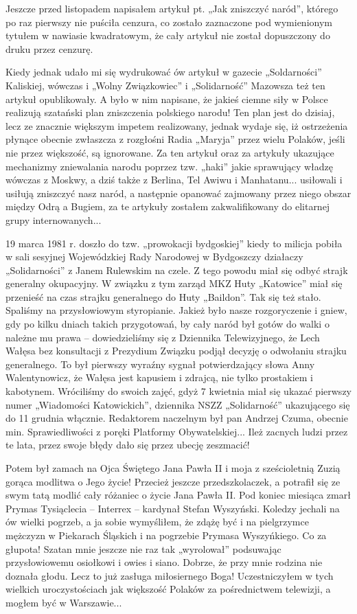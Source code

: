 Jeszcze przed listopadem napisałem artykuł pt. „Jak zniszczyć naród”, którego po raz pierwszy nie puściła cenzura, co zostało zaznaczone pod wymienionym tytułem w nawiasie kwadratowym, że cały artykuł nie został dopuszczony do druku przez cenzurę.

Kiedy jednak udało mi się wydrukować ów artykuł w gazecie „Soldarności” Kaliskiej, wówczas i „Wolny Związkowiec” i „Solidarność” Mazowsza też ten artykuł opublikowały. A było w nim napisane, że jakieś ciemne siły w Polsce realizują szatański plan zniszczenia polskiego narodu! Ten plan jest do dzisiaj, lecz ze znacznie większym impetem realizowany, jednak wydaje się, iż ostrzeżenia płynące obecnie zwłaszcza z rozgłośni Radia „Maryja” przez wielu Polaków, jeśli nie przez większość, są ignorowane. Za ten artykuł oraz za artykuły ukazujące mechanizmy zniewalania narodu poprzez tzw. „haki” jakie sprawujący władzę wówczas z Moskwy, a dziś także z Berlina, Tel Awiwu i Manhatanu... usiłowali i usiłują zniszczyć nasz naród, a następnie opanować zajmowany przez niego obszar między Odrą a Bugiem, za te artykuły zostałem zakwalifikowany do elitarnej grupy internowanych...

19 marca 1981 r. doszło do tzw. „prowokacji bydgoskiej” kiedy to milicja pobiła w sali sesyjnej Wojewódzkiej Rady Narodowej w Bydgoszczy działaczy „Solidarności” z Janem Rulewskim na czele. Z tego powodu miał się odbyć strajk generalny okupacyjny. W związku z tym zarząd MKZ Huty „Katowice” miał się przenieść na czas strajku generalnego do Huty „Baildon”. Tak się też stało. Spaliśmy na przysłowiowym styropianie. Jakież było nasze rozgoryczenie i gniew, gdy po kilku dniach takich przygotowań, by cały naród był gotów do walki o należne mu prawa – dowiedzieliśmy się z Dziennika Telewizyjnego, że Lech Wałęsa bez konsultacji z Prezydium Związku podjął decyzję o odwołaniu strajku generalnego. To był pierwszy wyraźny sygnał potwierdzający słowa Anny Walentynowicz, że Wałęsa jest kapusiem i zdrajcą, nie tylko prostakiem i kabotynem. Wróciliśmy do swoich zajęć, gdyż 7 kwietnia miał się ukazać pierwszy numer „Wiadomości Katowickich”, dziennika NSZZ „Solidarność” ukazującego się do 11 grudnia włącznie. Redaktorem naczelnym był pan Andrzej Czuma, obecnie min. Sprawiedliwości z poręki Platformy Obywatelskiej... Ileż zacnych ludzi przez te lata, przez swoje błędy dało się przez ubecję zeszmacić!

Potem był zamach na Ojca Świętego Jana Pawła II i moja z sześcioletnią Zuzią gorąca modlitwa o Jego życie! Przecież jeszcze przedszkolaczek, a potrafił się ze swym tatą modlić cały różaniec o życie Jana Pawła II. Pod koniec miesiąca zmarł Prymas Tysiąclecia – Interrex – kardynał Stefan Wyszyński. Koledzy jechali na ów wielki pogrzeb, a ja sobie wymyśliłem, że zdążę być i na pielgrzymce mężczyzn w Piekarach Śląskich i na pogrzebie Prymasa Wyszyńkiego. Co za głupota! Szatan mnie jeszcze nie raz tak „wyrolował” podsuwając przysłowiowemu osiołkowi i owies i siano. Dobrze, że przy mnie rodzina nie doznała głodu. Lecz to już zasługa miłosiernego Boga! Uczestniczyłem w tych wielkich uroczystościach jak większość Polaków za pośrednictwem telewizji, a mogłem być w Warszawie...

